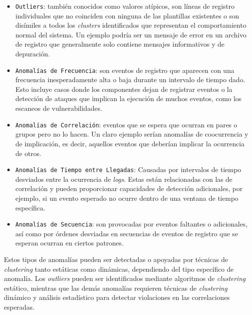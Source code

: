 \begin{itemize}
\item \texttt{Outliers}\label{outliers}: también conocidos como valores atípicos, son líneas de registro individuales que no coinciden con ninguna de las plantillas existentes o son disímiles a todos los \textit{clusters} identificados que representan el comportamiento normal del sistema. Un ejemplo podría ser un mensaje de error en un archivo de registro que generalmente solo contiene mensajes informativos y de depuración. \\
\item \texttt{Anomalías de Frecuencia}: son eventos de registro que aparecen con una frecuencia inesperadamente alta o baja durante un intervalo de tiempo dado. Esto incluye casos donde los componentes dejan de registrar eventos o la detección de ataques que implican la ejecución de muchos eventos, como los escaneos de vulnerabilidades. \\
\item \texttt{Anomalías de Correlación}: eventos que se espera que ocurran en pares o grupos pero no lo hacen. Un claro ejemplo serían anomalías de coocurrencia y de implicación, es decir, aquellos eventos que deberían implicar la ocurrencia de otros. \\
\item \texttt{Anomalías de Tiempo entre Llegadas}: Causadas por intervalos de tiempo desviados entre la ocurrencia de \textit{logs}. Estas están relacionadas con las de correlación y pueden proporcionar capacidades de detección adicionales, por ejemplo, si un evento esperado no ocurre dentro de una ventana de tiempo específica. \\
\item \texttt{Anomalías de Secuencia}: son provocadas por eventos faltantes o adicionales, así como por órdenes desviadas en secuencias de eventos de registro que se esperan ocurran en ciertos patrones.
\end{itemize}

Estos tipos de anomalías pueden ser detectadas o apoyadas por técnicas de \textit{clustering} tanto estáticas como dinámicas, dependiendo del tipo específico de anomalía. Los \textit{outliers} pueden ser identificados mediante algoritmos de \textit{clustering} estático, mientras que las demás anomalías requieren técnicas de \textit{clustering} dinámico y análisis estadístico para detectar violaciones en las correlaciones esperadas.


